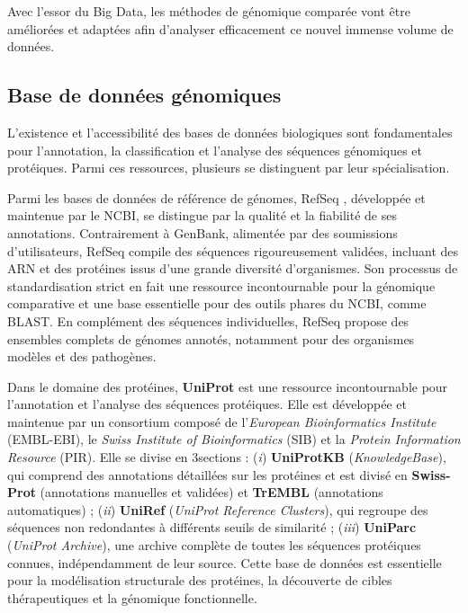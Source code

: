 Avec l’essor du Big Data, les méthodes de génomique comparée vont être améliorées et adaptées afin d'analyser efficacement ce nouvel immense volume de données.

\subsection{Base de données génomiques}

L’existence et l’accessibilité des bases de données biologiques sont fondamentales pour l’annotation, la classification et l’analyse des séquences génomiques et protéiques. Parmi ces ressources, plusieurs se distinguent par leur spécialisation.

Parmi les bases de données de référence de génomes, RefSeq \cite{pruitt_ncbi_2007}, développée et maintenue par le NCBI, se distingue par la qualité et la fiabilité de ses annotations. Contrairement à GenBank, alimentée par des soumissions d’utilisateurs, RefSeq compile des séquences rigoureusement validées, incluant des ARN et des protéines issus d’une grande diversité d’organismes. Son processus de standardisation strict en fait une ressource incontournable pour la génomique comparative et une base essentielle pour des outils phares du NCBI, comme BLAST. En complément des séquences individuelles, RefSeq propose des ensembles complets de génomes annotés, notamment pour des organismes modèles et des pathogènes.

Dans le domaine des protéines, \textbf{UniProt} \cite{the_uniprot_consortium_uniprot_2025} est une ressource incontournable pour l’annotation et l’analyse des séquences protéiques. Elle est développée et maintenue par un consortium composé de l'\textit{European Bioinformatics Institute }(EMBL-EBI), le \textit{Swiss Institute of Bioinformatics} (SIB) et la \textit{Protein Information Resource} (PIR). Elle se divise en 3sections : (\textit{i}) \textbf{UniProtKB} (\textit{KnowledgeBase}), qui comprend des annotations détaillées sur les protéines et est divisé en \textbf{Swiss-Prot} (annotations manuelles et validées) et \textbf{TrEMBL} (annotations automatiques) \cite{apweiler_uniprot_2004,bairoch_swiss-prot_2004} ; (\textit{ii}) \textbf{UniRef} (\textit{UniProt Reference Clusters}), qui regroupe des séquences non redondantes à différents seuils de similarité \cite{suzek_uniref_2007}; (\textit{iii}) \textbf{UniParc} (\textit{UniProt Archive}), une archive complète de toutes les séquences protéiques connues, indépendamment de leur source. Cette base de données est essentielle pour la modélisation structurale des protéines, la découverte de cibles thérapeutiques et la génomique fonctionnelle.

